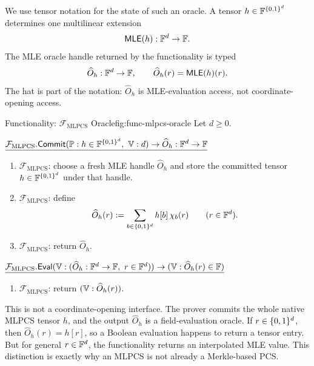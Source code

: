 We use tensor notation for the state of such an oracle.  A tensor
\(h\in\mathbb{F}^{\{0,1\}^d}\) determines one multilinear extension
\[
  \mathsf{MLE}(h):\mathbb{F}^d\to\mathbb{F}.
\]
The MLE oracle handle returned by the functionality is typed
\[
  \widehat O_h:\mathbb{F}^d\to\mathbb{F},
  \qquad
  \widehat O_h(r)=\mathsf{MLE}(h)(r).
\]
The hat is part of the notation: \(\widehat O_h\) is MLE-evaluation access,
not coordinate-opening access.

\begin{protocolbox}{Functionality: \(\mathcal F_{\mathrm{MLPCS}}\) Oracle}{fig:func-mlpcs-oracle}
Let \(d\ge 0\).

\smallskip
\noindent\(\underline{\mathcal F_{\mathrm{MLPCS}}.\mathsf{Commit}(\prover:h\in\F^{\B^d},\ \verifier:d)\to \widehat O_h:\F^d\to\F}\)

\smallskip
\begin{enumerate}[leftmargin=0.24in,label=\textbf{L\arabic*.},itemsep=0.08em,topsep=0.1em,parsep=0pt]
  \item \(\mathcal F_{\mathrm{MLPCS}}\): choose a fresh MLE handle
        \(\widehat O_h\) and store the committed tensor
        \(h\in\mathbb{F}^{\{0,1\}^d}\) under that handle.
  \item \(\mathcal F_{\mathrm{MLPCS}}\): define
        \[
          \widehat O_h(r)
          :=
          \sum_{b\in\{0,1\}^d} h[b]\,\chi_b(r)
          \qquad(r\in\mathbb{F}^d).
        \]
  \item \(\mathcal F_{\mathrm{MLPCS}}\): return \(\widehat O_h\).
\end{enumerate}

\smallskip
\noindent\(\underline{\mathcal F_{\mathrm{MLPCS}}.\mathsf{Eval}(\verifier:(\widehat O_h:\F^d\to\F,\ r\in\F^d))\to(\verifier:\widehat O_h(r)\in\F)}\)

\smallskip
\begin{enumerate}[leftmargin=0.24in,label=\textbf{E\arabic*.},itemsep=0.08em,topsep=0.1em,parsep=0pt]
  \item \(\mathcal F_{\mathrm{MLPCS}}\): return
        \((\mathbb{V}:\widehat O_h(r))\).
\end{enumerate}
\end{protocolbox}

This is not a coordinate-opening interface.  The prover commits the whole
native MLPCS tensor \(h\), and the output \(\widehat O_h\) is a
field-evaluation oracle.  If \(r\in\{0,1\}^d\), then
\(\widehat O_h(r)=h[r]\), so a Boolean evaluation happens to return a tensor
entry.  But for general \(r\in\mathbb{F}^d\), the functionality returns an interpolated
MLE value.  This distinction is exactly why an MLPCS is not already a
Merkle-based PCS.

